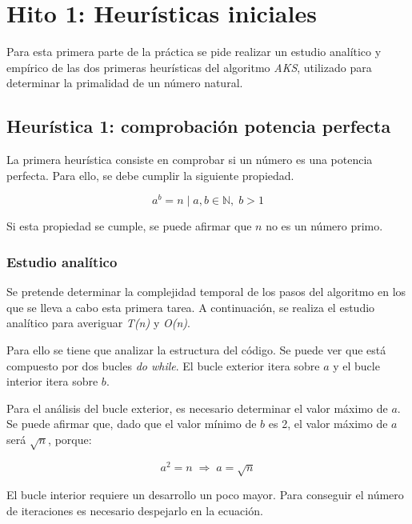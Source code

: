 \documentclass{uc3mpracticas}
\begin{document}
  \section{Hito 1: Heurísticas iniciales}

  Para esta primera parte de la práctica se pide realizar un estudio analítico y empírico de las dos primeras heurísticas del algoritmo \textit{AKS}, utilizado para determinar la primalidad de un número natural.

  \vspace{2mm}




  \subsection{Heurística 1: comprobación potencia perfecta}

  La primera heurística consiste en comprobar si un número es una potencia perfecta. Para ello, se debe cumplir la siguiente propiedad.

  $$ a^b = n \; | \; a, b \in \mathbb{N}, \; b>1$$

  Si esta propiedad se cumple, se puede afirmar que $n$ no es un número primo.


  \subsubsection{Estudio analítico}
  Se pretende determinar la complejidad temporal de los pasos del algoritmo en los que se lleva a cabo esta primera tarea. A continuación, se realiza el estudio analítico para averiguar \textit{T(n)} y \textit{O(n)}.

  \vspace{2mm}

  Para ello se tiene que analizar la estructura del código. Se puede ver que está compuesto por dos bucles \textit{do while}. El bucle exterior itera sobre $a$ y el bucle interior itera sobre $b$.

  \vspace{2mm}

  Para el análisis del bucle exterior, es necesario determinar el valor máximo de $a$.
  Se puede afirmar que, dado que el valor mínimo de $b$ es 2, el valor máximo de $a$ será $\sqrt{n}$, porque:

  $$ a^2 = n \; \Rightarrow \; a = \sqrt{n} $$

  El bucle interior requiere un desarrollo un poco mayor. Para conseguir el número de iteraciones es necesario despejarlo en la ecuación.
\end{document}
